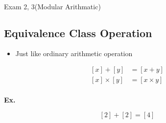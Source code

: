 \documentclass{note}
\begin{document}
\begin{note}{Exam 2, 3(Modular Arithmatic)}
        \subsection{Equivalence Class Operation}

        \begin{itemize}
            \item Just like ordinary arithmetic operation
        \end{itemize}

        \begin{align*}
            \left[x \right] + \left[y \right] &= \left[x + y \right]\\
            \left[x \right] \times \left[y \right] &= \left[x \times y \right]\\
        \end{align*}

        \textbf{Ex. }

        \begin{displaymath}
            \left[2 \right] + \left[2 \right] = \left[4 \right]
        \end{displaymath}


    \end{note}
\end{document}
